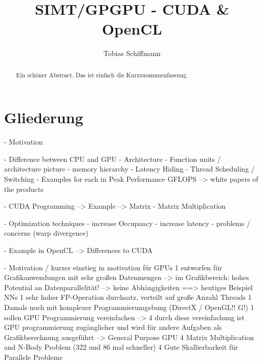 \documentclass[a4paper,12pt]{llncs}
\numberwithin{equation}{section}
\begin{document}


\author{Tobias Schiffmann}

\title{SIMT/GPGPU - CUDA \& OpenCL}

\maketitle

\thispagestyle{empty}

\begin{abstract}
Ein schöner Abstract. Das ist einfach die Kurzzusammenfassung.
\end{abstract}


\section{Gliederung}


- Motivation

- Difference between CPU and GPU
  - Architecture
    - Function units / architecture picture
    - memory hierarchy
  - Latency Hiding
  - Thread Scheduling / Switching
  - Examples for each in Peak Performance GFLOPS
    --> white papers of the products

- CUDA Programming
  --> Example
  --> Matrix - Matrix Multiplication
  
- Optimization techniques
  - increase Occupancy
  - increase latency
  - problems / concerns (warp divergence)
  
- Example in OpenCL
  --> Differences to CUDA







- Motivation / kurzer einstieg in motivation für GPUs
  1 entworfen für Grafikanwendungen mit sehr großen Datenmengen
    --> im Grafikbereich: hohes Potential an Datenparallelität! --> keine Abhängigkeiten
    ==> heutiges Beispiel NNs
  1 sehr hoher FP-Operation durchsatz, verteilt auf große Anzahl Threads
  1 Damals noch mit komplexer Programmierumgebung (DirectX / OpenGL!! G!)
  1 sollen GPU Programmierung vereinfachen
	 --> 4 durch diese vereinfachung ist GPU programmierung zugänglicher und wird für andere Aufgaben als Grafikberechnung ausgeführt --> General Purpose GPU
	 4 Matrix Multiplication and N-Body Problem (322 und 86 mal schneller)
	 4 Gute Skallierbarkeit für Parallele Probleme
	   
\end{document}
